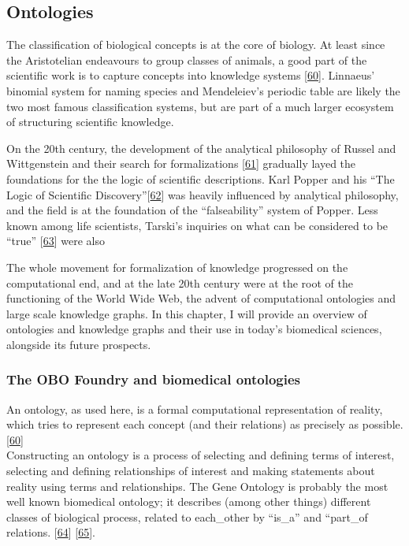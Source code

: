 \hypertarget{ontologies}{%
\subsection{Ontologies}\label{ontologies}}

The classification of biological concepts is at the core of biology. At least since the Aristotelian endeavours to group classes of animals, a good part of the scientific work is to capture concepts into knowledge systems {[}\protect\hyperlink{ref-DLTMbf54}{60}{]}.
Linnaeus' binomial system for naming species and Mendeleiev's periodic table are likely the two most famous classification systems, but are part of a much larger ecosystem of structuring scientific knowledge.

On the 20th century, the development of the analytical philosophy of Russel and Wittgenstein and their search for formalizations {[}\protect\hyperlink{ref-cZEmYsqx}{61}{]} gradually layed the foundations for the the logic of scientific descriptions. Karl Popper and his ``The Logic of Scientific Discovery''{[}\protect\hyperlink{ref-to2onCDy}{62}{]} was heavily influenced by analytical philosophy, and the field is at the foundation of the ``falseability'' system of Popper. Less known among life scientists, Tarski's inquiries on what can be considered to be ``true'' {[}\protect\hyperlink{ref-RghcuiSS}{63}{]} were also

The whole movement for formalization of knowledge progressed on the computational end, and at the late 20th century were at the root of the functioning of the World Wide Web, the advent of computational ontologies and large scale knowledge graphs.
In this chapter, I will provide an overview of ontologies and knowledge graphs and their use in today's biomedical sciences, alongside its future prospects.

\hypertarget{the-obo-foundry-and-biomedical-ontologies}{%
\subsubsection{The OBO Foundry and biomedical ontologies}\label{the-obo-foundry-and-biomedical-ontologies}}

An ontology, as used here, is a formal computational representation of reality, which tries to represent each concept (and their relations) as precisely as possible. {[}\protect\hyperlink{ref-DLTMbf54}{60}{]}\\
Constructing an ontology is a process of selecting and defining terms of interest, selecting and defining relationships of interest and making statements about reality using terms and relationships.
The Gene Ontology is probably the most well known biomedical ontology; it describes (among other things) different classes of biological process, related to each\_other by ``is\_a'' and ``part\_of relations. {[}\protect\hyperlink{ref-18wkLcGxT}{64}{]} {[}\protect\hyperlink{ref-2KmDs8gy}{65}{]}.

